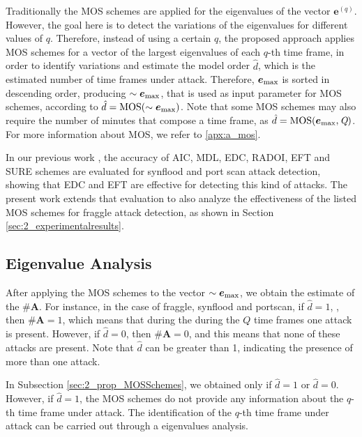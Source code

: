 Traditionally the MOS schemes are applied for the eigenvalues of the vector $\boldsymbol{e}^{(q)}$. However, the goal here is to detect the variations of the eigenvalues for different values of $q$. Therefore, instead of using a certain $q$, the proposed approach applies MOS schemes for a vector of the largest eigenvalues of each $q$-th time frame, in order to identify variations and estimate the model order $\hat{d}$, which is the estimated number of time frames under attack. Therefore, $\boldsymbol{e}_{\rm max}$ is sorted in descending order, producing $\sim\boldsymbol{e}_{\rm max}$, that is used as input parameter for MOS schemes, according to $\hat{d} = \rm{MOS}(\sim\boldsymbol{e}_{\rm max})$. Note that some MOS schemes may also require the number of minutes that compose a time frame, as $\hat{d} = \rm{MOS}(\boldsymbol{e}_{\rm max},\emph{Q})$. For more information about MOS, we refer to \ref{apx:a_mos}.

In our previous work \cite{tenorio2013greatest}, the accuracy of AIC, MDL, EDC, RADOI, EFT and SURE schemes are evaluated for synflood and port scan attack detection, showing that EDC and EFT are effective for detecting this kind of attacks. The present work extends that evaluation to also analyze the effectiveness of the listed MOS schemes for fraggle attack detection, as shown in Section \ref{sec:2_experimentalresults}.

\subsection{Eigenvalue Analysis}
\label{sec:2_prop_EigenvalueAnalysis}

After applying the MOS schemes to the vector $\sim\boldsymbol{e}_{\rm max}$, we obtain the estimate of the $\#\boldsymbol{A}$. For instance, in the case of fraggle, synflood and portscan, if $\hat{d} = 1$, , then $\#\boldsymbol{A} = 1$, which means that during the during the $Q$ time frames one attack is present. However, if $\hat{d} = 0$, then $\#\boldsymbol{A} = 0$, and this means that none of these attacks are present. Note that $\hat{d}$ can be greater than 1, indicating the presence of more than one attack.

In Subsection \ref{sec:2_prop_MOSSchemes}, we obtained only if $\hat{d} = 1$ or $\hat{d} = 0$. However, if $\hat{d} = 1$, the MOS schemes do not provide any information about the $q$-th time frame under attack. The identification of the $q$-th time frame under attack can be carried out through a eigenvalues analysis.

